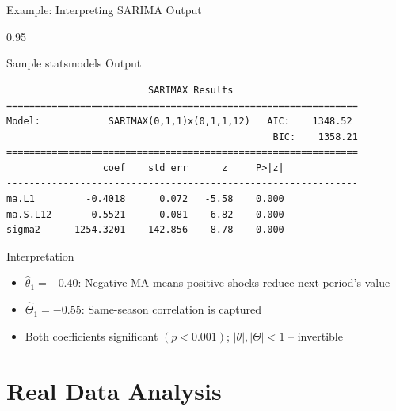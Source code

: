 \documentclass[9pt, aspectratio=169, t]{beamer}
\begin{document}
\begin{frame}[fragile]{Example: Interpreting SARIMA Output}
    \begin{cminipage}{0.95\textwidth}
    \begin{block}{Sample statsmodels Output}
        \scriptsize
        \begin{verbatim}
                         SARIMAX Results
==============================================================
Model:            SARIMAX(0,1,1)x(0,1,1,12)   AIC:    1348.52
                                               BIC:    1358.21
==============================================================
                 coef    std err      z     P>|z|
--------------------------------------------------------------
ma.L1         -0.4018      0.072   -5.58    0.000
ma.S.L12      -0.5521      0.081   -6.82    0.000
sigma2      1254.3201    142.856    8.78    0.000
        \end{verbatim}
    \end{block}
    \vspace{-0.15cm}
    \begin{block}{Interpretation}
        {\small
        \begin{itemize}\setlength{\itemsep}{0pt}
            \item $\hat{\theta}_1 = -0.40$: Negative MA means positive shocks reduce next period's value
            \item $\hat{\Theta}_1 = -0.55$: Same-season correlation is captured
            \item Both coefficients significant $(p < 0.001)$; $|\theta|, |\Theta| < 1$ -- invertible
        \end{itemize}
        }
    \end{block}
    \end{cminipage}
\end{frame}

\section{Real Data Analysis}
\end{document}
